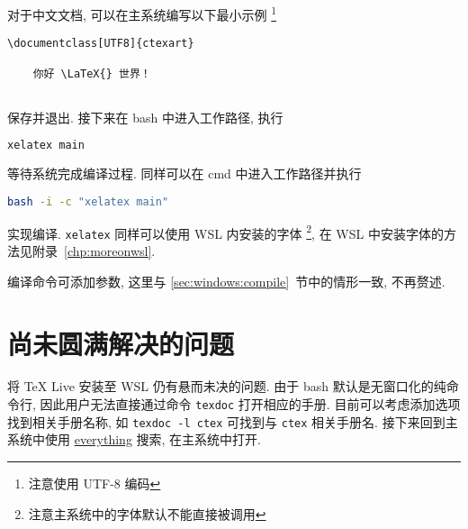 对于中文文档, 可以在主系统编写以下最小示例%
\footnote{注意使用 UTF-8 编码}%
\begin{lstlisting}[language={[LaTeX]TeX}]
  \documentclass[UTF8]{ctexart}
  
    你好 \LaTeX{} 世界！
  
\end{lstlisting}
保存并退出.
接下来在 \textsf{bash} 中进入工作路径,
执行
\begin{lstlisting}[language=bash]
  xelatex main
\end{lstlisting}
等待系统完成编译过程.
同样可以在 \textsf{cmd} 中进入工作路径并执行
\begin{lstlisting}[language=bash]
  bash -i -c "xelatex main"
\end{lstlisting}
实现编译.
\texttt{xelatex} 同样可以使用 WSL 内安装的字体%
\footnote{注意主系统中的字体默认不能直接被调用},
在 WSL 中安装字体的方法见附录~\ref{chp:moreonwsl}.

编译命令可添加参数, 这里与 \ref{sec:windows:compile}~节中的情形一致, 不再赘述.

\section{尚未圆满解决的问题}

将 \TeX{} Live 安装至 WSL 仍有悬而未决的问题.
由于 \textsf{bash} 默认是无窗口化的纯命令行,
因此用户无法直接通过命令 \texttt{texdoc} 打开相应的手册.
目前可以考虑添加选项找到相关手册名称,
如 \texttt{texdoc -l ctex} 可找到与 \texttt{ctex} 相关手册名.
接下来回到主系统中使用 \href{https://www.voidtools.com/zh-cn/}{everything} 搜索,
在主系统中打开.
